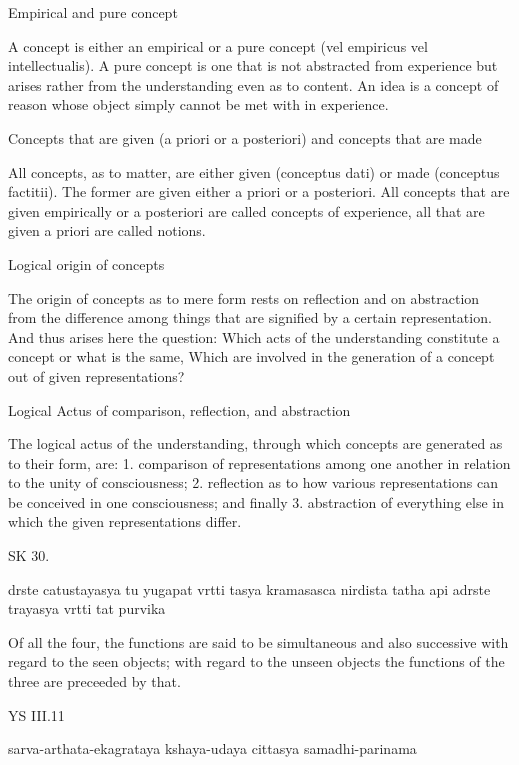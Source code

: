     Empirical and pure concept

        A concept is either an empirical or a pure concept
        (vel empiricus vel intellectualis).
        A pure concept is one that is not abstracted from experience
        but arises rather from the understanding even as to content.
        An idea is a concept of reason whose object
        simply cannot be met with in experience.

    Concepts that are given (a priori or a posteriori)
    and concepts that are made

        All concepts, as to matter, are either
        given (conceptus dati) or made (conceptus factitii).
        The former are given either a priori or a posteriori.
        All concepts that are given empirically or a posteriori
        are called concepts of experience,
        all that are given a priori are called notions.

    Logical origin of concepts

        The origin of concepts as to mere form rests on reflection
        and on abstraction from the difference among things
        that are signified by a certain representation.
        And thus arises here the question:
        Which acts of the understanding constitute a concept
        or what is the same,
        Which are involved in the generation of a concept
        out of given representations?

    Logical Actus of comparison, reflection, and abstraction

        The logical actus of the understanding,
        through which concepts are generated as to their form, are:
        1.  comparison of representations among one another
            in relation to the unity of consciousness;
        2.  reflection as to how various representations can
            be conceived in one consciousness; and finally
        3.  abstraction of everything else
            in which the given representations differ.

SK 30.

drste catustayasya tu yugapat vrtti tasya kramasasca nirdista
tatha api adrste trayasya vrtti tat purvika

Of all the four, the functions are said to be
simultaneous and also successive
with regard to the seen objects;
with regard to the unseen objects
the functions of the three are preceeded by that.

YS III.11

    sarva-arthata-ekagrataya kshaya-udaya cittasya samadhi-parinama

